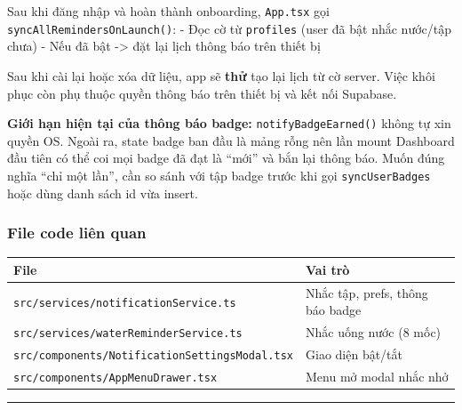 \documentclass[12pt,a4paper]{article}
\newcounter{none}
\providecommand{\passthrough}[1]{#1}
\begin{document}
Sau khi đăng nhập và hoàn thành onboarding,
\passthrough{\lstinline!App.tsx!} gọi
\passthrough{\lstinline!syncAllRemindersOnLaunch()!}: - Đọc cờ từ
\passthrough{\lstinline!profiles!} (user đã bật nhắc nước/tập chưa) -
Nếu đã bật -\textgreater{} đặt lại lịch thông báo trên thiết bị

Sau khi cài lại hoặc xóa dữ liệu, app sẽ \textbf{thử} tạo lại lịch từ cờ
server. Việc khôi phục còn phụ thuộc quyền thông báo trên thiết bị và
kết nối Supabase.

\textbf{Giới hạn hiện tại của thông báo badge:}
\passthrough{\lstinline!notifyBadgeEarned()!} không tự xin quyền OS.
Ngoài ra, state badge ban đầu là mảng rỗng nên lần mount Dashboard đầu
tiên có thể coi mọi badge đã đạt là ``mới'' và bắn lại thông báo. Muốn
đúng nghĩa ``chỉ một lần'', cần so sánh với tập badge trước khi gọi
\passthrough{\lstinline!syncUserBadges!} hoặc dùng danh sách id vừa
insert.

\subsubsection{File code liên quan}\label{file-code-liuxean-quan-2}

{\def\LTcaptype{none} %
\begin{longtable}[]{@{}
  >{\raggedright\arraybackslash}p{}
  >{\raggedright\arraybackslash}p{}@{}}
\toprule\noalign{}
\begin{minipage}[b]{\linewidth}\raggedright
File
\end{minipage} & \begin{minipage}[b]{\linewidth}\raggedright
Vai trò
\end{minipage} \\
\midrule\noalign{}
\endhead
\bottomrule\noalign{}
\endlastfoot
\passthrough{\lstinline!src/services/notificationService.ts!} & Nhắc
tập, prefs, thông báo badge \\
\passthrough{\lstinline!src/services/waterReminderService.ts!} & Nhắc
uống nước (8 mốc) \\
\passthrough{\lstinline!src/components/NotificationSettingsModal.tsx!} &
Giao diện bật/tắt \\
\passthrough{\lstinline!src/components/AppMenuDrawer.tsx!} & Menu mở
modal nhắc nhở \\
\end{longtable}
}

\begin{center}\rule{0.5\linewidth}{0.5pt}\end{center}
\end{document}
